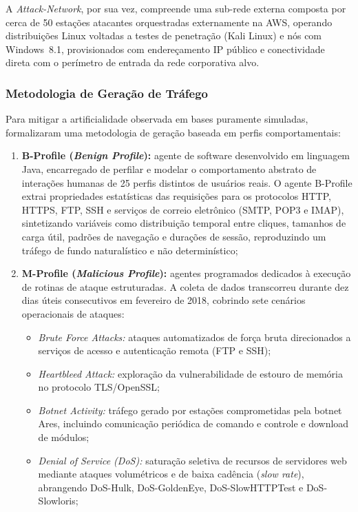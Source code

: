 A \emph{Attack-Network}, por sua vez, compreende uma sub-rede externa composta por cerca de 50 estações atacantes orquestradas externamente na AWS, operando distribuições Linux voltadas a testes de penetração (Kali Linux) e nós com Windows~8.1, provisionados com endereçamento IP público e conectividade direta com o perímetro de entrada da rede corporativa alvo.

\subsubsection{Metodologia de Geração de Tráfego}

Para mitigar a artificialidade observada em bases puramente simuladas,  formalizaram uma metodologia de geração baseada em perfis comportamentais:
\begin{enumerate}
    \item \textbf{B-Profile (\emph{Benign Profile}):} agente de software desenvolvido em linguagem Java, encarregado de perfilar e modelar o comportamento abstrato de interações humanas de 25 perfis distintos de usuários reais. O agente B-Profile extrai propriedades estatísticas das requisições para os protocolos HTTP, HTTPS, FTP, SSH e serviços de correio eletrônico (SMTP, POP3 e IMAP), sintetizando variáveis como distribuição temporal entre cliques, tamanhos de carga útil, padrões de navegação e durações de sessão, reproduzindo um tráfego de fundo naturalístico e não determinístico;
    \item \textbf{M-Profile (\emph{Malicious Profile}):} agentes programados dedicados à execução de rotinas de ataque estruturadas. A coleta de dados transcorreu durante dez dias úteis consecutivos em fevereiro de 2018, cobrindo sete cenários operacionais de ataques:
    \begin{itemize}
        \item \emph{Brute Force Attacks:} ataques automatizados de força bruta direcionados a serviços de acesso e autenticação remota (FTP e SSH);
        \item \emph{Heartbleed Attack:} exploração da vulnerabilidade de estouro de memória no protocolo TLS/OpenSSL;
        \item \emph{Botnet Activity:} tráfego gerado por estações comprometidas pela botnet Ares, incluindo comunicação periódica de comando e controle e download de módulos;
        \item \emph{Denial of Service (DoS):} saturação seletiva de recursos de servidores web mediante ataques volumétricos e de baixa cadência (\emph{slow rate}), abrangendo DoS-Hulk, DoS-GoldenEye, DoS-SlowHTTPTest e DoS-Slowloris;

\end{itemize}
\end{enumerate}
